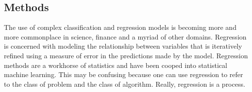 \documentclass[conference]{IEEEtran}
\begin{document}
\begin{table}[!htbp] \centering 
{}
  \caption{Summary of Data collected for this study} 
  \label{tab:summ} 
\end{table}

\subsection{Methods}
The use of complex classification and regression models is becoming more and more commonplace in science, finance and a myriad of other domains. Regression is concerned with modeling the relationship between variables that is iteratively refined using a measure of error in the predictions made by the model. Regression methods are a workhorse of statistics and have been cooped into statistical machine learning. This may be confusing because one can use regression to refer to the class of problem and the class of algorithm. Really, regression is a process.
\end{document}
